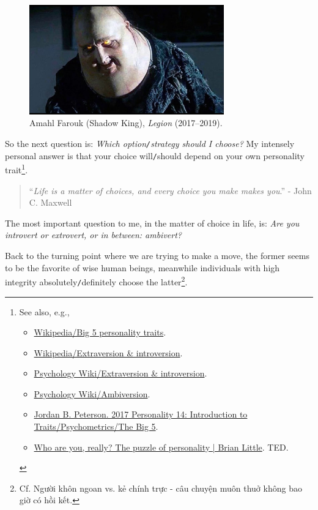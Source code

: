 \documentclass[12pt]{article}
\begin{document}
\begin{figure}[H]
	\centering
	\includegraphics[width=0.75\textwidth]{Shadow_King}
	\caption{Amahl Farouk (Shadow King), {\it Legion} (2017--2019).}
	\label{fig3}
\end{figure}
So the next question is: {\it Which option{\tt/}strategy should I choose?} My intensely personal answer is that your choice will{\tt/}should depend on your own personality trait\footnote{See also, e.g.,
	\begin{itemize}
		\item \href{https://en.wikipedia.org/wiki/Big_Five_personality_traits}{Wikipedia/Big 5 personality traits}.
		\item \href{https://en.wikipedia.org/wiki/Extraversion_and_introversion}{Wikipedia/Extraversion \& introversion}.
		\item \href{https://psychology.wikia.org/wiki/Extraversion_and_introversion}{Psychology Wiki/Extraversion \& introversion}.
		\item \href{https://psychology.wikia.org/wiki/Ambiversion}{Psychology Wiki/Ambiversion}.
		\item \href{https://www.youtube.com/watch?v=pCceO_D4AlY}{Jordan B. Peterson. 2017 Personality 14: Introduction to Traits/Psychometrics/The Big 5}.
		\item \href{https://www.youtube.com/watch?v=qYvXk_bqlBk}{Who are you, really? The puzzle of personality | Brian Little}. TED.
\end{itemize}}.
\begin{quotation}
	``{\it Life is a matter of choices, and every choice you make makes you}.'' - John C. Maxwell
\end{quotation}
The most important question to me, in the matter of choice in life, is: {\it Are you introvert or extrovert, or in between: ambivert?}

Back to the turning point where we are trying to make a move, the former seems to be the favorite of wise human beings, meanwhile individuals with high integrity absolutely{\tt/}definitely choose the latter\footnote{Cf. Người khôn ngoan vs. kẻ chính trực - câu chuyện muôn thuở không bao giờ có hồi kết.}.
\end{document}
